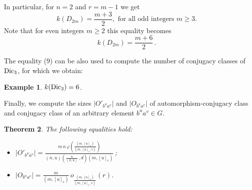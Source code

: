 \documentclass[12pt]{article}
\newtheorem{theorem}{Theorem}[section]
\newtheorem{example}[theorem]{Example}
\newcommand{\dd}{\displaystyle }
\newcommand{\0}{{\leqno}}
\begin{document}
In particular, for $n=2$ and $r=m-1$ we get
\begin{equation}
k(D_{2m})=\frac{m+3}{2}, \mbox{ for all odd integers } m\geq 3.\nonumber
\end{equation}Note that for even integers $m\geq 2$ this equality becomes
\begin{equation}
k(D_{2m})=\frac{m+6}{2}\,.\nonumber
\end{equation}

The equality (9) can be also used to compute the number of conjugacy classes of ${\rm Dic}_3$, for which we obtain:

\begin{example}
$k({\rm Dic}_3)=6$.\nonumber
\end{example}

Finally, we compute the sizes $|O'_{b^ua^v}|$ and $|O_{b^ua^v}|$ of automorphism-conjugacy class and conjugacy class of an arbitrary element $b^ua^v\in G$.

\begin{theorem}
The following equalities hold:
\begin{itemize}
\item[{\rm a)}] $|O'_{b^ua^v}|=\dd\frac{m\,n\,\varphi\!\left(\dd\frac{(m,[u]_r)}{(m,[u]_r,v)}\right)}{(n,u)\left(\dd\frac{n}{(n,u)}\,,d\right)(m,[u]_r)}$\,;
\item[{\rm b)}] $|O_{b^ua^v}|=\dd\frac{m}{(m,[u]_r)}\,o_{\frac{(m,[u]_r)}{(m,[u]_r,v)}}(r)$.
\end{itemize}
\end{theorem}
\end{document}
